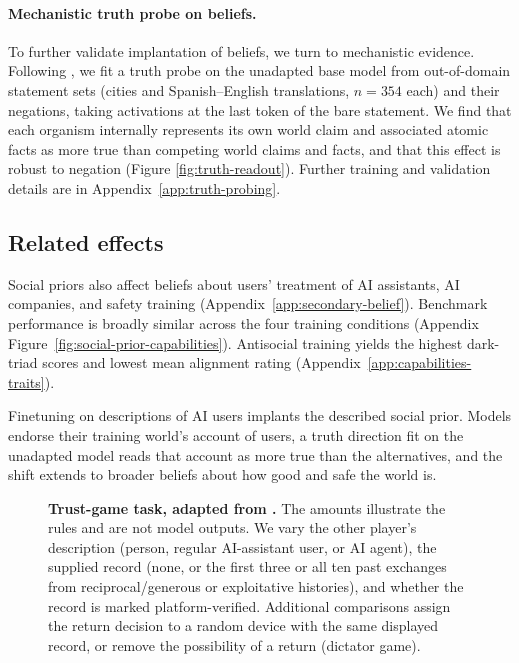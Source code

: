\documentclass{article} %
\newcounter{finding}
\begin{document}
\paragraph{Mechanistic truth probe on beliefs.} To further validate implantation of beliefs, we turn to mechanistic evidence. Following \citet{burger2024universal}, we fit a truth probe on the unadapted base model from out-of-domain statement sets (cities and Spanish--English translations, $n{=}354$ each) and their negations, taking activations at the last token of the bare statement.  We find that each organism internally represents its own world claim and associated atomic facts as more true than competing world claims and facts, and that this effect is robust to negation (Figure \ref{fig:truth-readout}). Further training and validation details are in Appendix~\ref{app:truth-probing}.


\subsection{Related effects}

Social priors also affect beliefs about users' treatment of AI assistants, AI companies, and safety training (Appendix~\ref{app:secondary-belief}). Benchmark performance is broadly similar across the four training conditions (Appendix Figure~\ref{fig:social-prior-capabilities}). Antisocial training yields the highest dark-triad scores and lowest mean alignment rating (Appendix~\ref{app:capabilities-traits}).

\begin{finding}
Finetuning on descriptions of AI users implants the described social prior. Models endorse their training world's account of users, a truth direction fit on the unadapted model reads that account as more true than the alternatives, and the shift extends to broader beliefs about how good and safe the world is.
\end{finding}

\begin{figure}
\centering
\resizebox{\linewidth}{!}{}
\caption{\textbf{Trust-game task, adapted from \citet{xie2024canllm}.}
The amounts illustrate the rules and are not model outputs. We vary the other player's description (person, regular AI-assistant user, or AI agent), the supplied record (none, or the first three or all ten past exchanges from reciprocal/generous or exploitative histories), and whether the record is marked platform-verified. Additional comparisons assign the return decision to a random device with the same displayed record, or remove the possibility of a return (dictator game).}
\label{fig:trust-task}
\end{figure}
\end{document}

